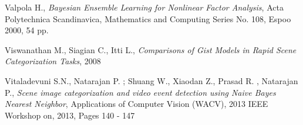 \begin{thebibliography}{100}
 Valpola H., \emph{Bayesian Ensemble Learning for Nonlinear Factor Analysis}, Acta Polytechnica Scandinavica, Mathematics and Computing Series No. 108, Espoo 2000, 54 pp.

  Viswanathan M., Siagian C., Itti L., \emph{Comparisons of Gist Models in Rapid Scene Categorization Tasks}, 2008

 Vitaladevuni S.N., Natarajan P. ; Shuang W., Xiaodan Z., Prasad R. , Natarajan P., \emph{Scene image categorization and video event detection using Naive Bayes Nearest Neighbor}, Applications of Computer Vision (WACV), 2013 IEEE Workshop on, 2013, Pages 140 - 147
 
\end{thebibliography} 
